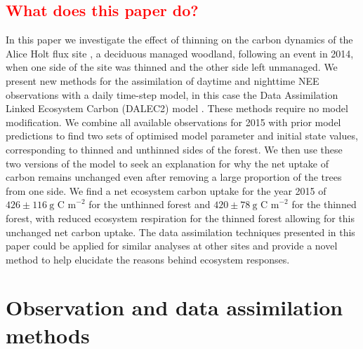 \documentclass[draft,linenumbers]{agujournal}
\begin{document}
\subsection{\textcolor{red}{What does this paper do?}}
In this paper we investigate the effect of thinning on the carbon dynamics of the Alice Holt flux site \citep{wilkinson2012inter}, a deciduous managed woodland, following an event in 2014, when one side of the site was thinned and the other side left unmanaged. 
We present new methods for the assimilation of daytime and nighttime NEE observations with a daily time-step model, in this case the Data Assimilation Linked Ecosystem Carbon (DALEC2) model \citep{Bloom2015}. These methods require no model modification. We combine all available observations for 2015 with prior model predictions to find two sets of optimised model parameter and initial state values, corresponding to thinned and unthinned sides of the forest. We then use these two versions of the model to seek an explanation for why the net uptake of carbon remains unchanged even after removing a large proportion of the trees from one side. We find a net ecosystem carbon uptake for the year 2015 of \(426 \pm 116~\text{g C m}^{-2}\) for the unthinned forest and \(420 \pm 78~\text{g C m}^{-2}\) for the thinned forest, with reduced ecosystem respiration for the thinned forest allowing for this unchanged net carbon uptake. The data assimilation techniques presented in this paper could be applied for similar analyses at other sites and provide a novel method to help elucidate the reasons behind ecosystem responses.      

\section{Observation and data assimilation methods}
\end{document}
